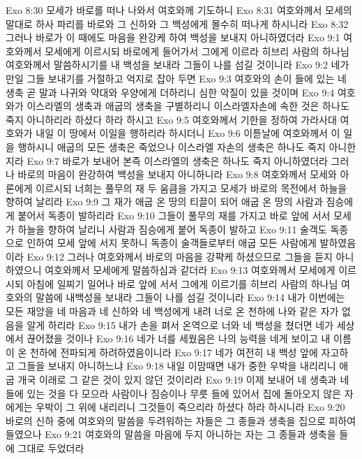 Exo 8:30  모세가 바로를 떠나 나와서 여호와께 기도하니
Exo 8:31  여호와께서 모세의 말대로 하사 파리를 바로와 그 신하와 그 백성에게 몰수히 떠나게 하시니라
Exo 8:32  그러나 바로가 이 때에도 마음을 완강케 하여 백성을 보내지 아니하였더라
Exo 9:1  여호와께서 모세에게 이르시되 바로에게 들어가서 그에게 이르라 히브리 사람의 하나님 여호와께서 말씀하시기를 내 백성을 보내라 그들이 나를 섬길 것이니라
Exo 9:2  네가 만일 그들 보내기를 거절하고 억지로 잡아 두면
Exo 9:3  여호와의 손이 들에 있는 네 생축 곧 말과 나귀와 약대와 우양에게 더하리니 심한 악질이 있을 것이며
Exo 9:4  여호와가 이스라엘의 생축과 애굽의 생축을 구별하리니 이스라엘자손에 속한 것은 하나도 죽지 아니하리라 하셨다 하라 하시고
Exo 9:5  여호와께서 기한을 정하여 가라사대 여호와가 내일 이 땅에서 이일을 행하리라 하시더니
Exo 9:6  이튿날에 여호와께서 이 일을 행하시니 애굽의 모든 생축은 죽었으나 이스라엘 자손의 생축은 하나도 죽지 아니한지라
Exo 9:7  바로가 보내어 본즉 이스라엘의 생축은 하나도 죽지 아니하였더라 그러나 바로의 마음이 완강하여 백성을 보내지 아니하니라
Exo 9:8  여호와께서 모세와 아론에게 이르시되 너희는 풀무의 재 두 움큼을 가지고 모세가 바로의 목전에서 하늘을 향하여 날리라
Exo 9:9  그 재가 애굽 온 땅의 티끌이 되어 애굽 온 땅의 사람과 짐승에게 붙어서 독종이 발하리라
Exo 9:10  그들이 풀무의 재를 가지고 바로 앞에 서서 모세가 하늘을 향하여 날리니 사람과 짐승에게 붙어 독종이 발하고
Exo 9:11  술객도 독종으로 인하여 모세 앞에 서지 못하니 독종이 술객들로부터 애굽 모든 사람에게 발하였음이라
Exo 9:12  그러나 여호와께서 바로의 마음을 강퍅케 하셨으므로 그들을 듣지 아니하였으니 여호와께서 모세에게 말씀하심과 같더라
Exo 9:13  여호와께서 모세에게 이르시되 아침에 일찌기 일어나 바로 앞에 서서 그에게 이르기를 히브리 사람의 하나님 여호와의 말씀에 내백성을 보내라 그들이 나를 섬길 것이니라
Exo 9:14  내가 이번에는 모든 재앙을 네 마음과 네 신하와 네 백성에게 내려 너로 온 천하에 나와 같은 자가 없음을 알게 하리라
Exo 9:15  내가 손을 펴서 온역으로 너와 네 백성을 쳤더면 네가 세상에서 끊어졌을 것이나
Exo 9:16  네가 너를 세웠음은 나의 능력을 네게 보이고 내 이름이 온 천하에 전파되게 하려하였음이니라
Exo 9:17  네가 여전히 내 백성 앞에 자고하고 그들을 보내지 아니하느냐
Exo 9:18  내일 이맘때면 내가 중한 우박을 내리리니 애굽 개국 이래로 그 같은 것이 있지 않던 것이리라
Exo 9:19  이제 보내어 네 생축과 네 들에 있는 것을 다 모으라 사람이나 짐승이나 무릇 들에 있어서 집에 돌아오지 않은 자에게는 우박이 그 위에 내리리니 그것들이 죽으리라 하셨다 하라 하시니라
Exo 9:20  바로의 신하 중에 여호와의 말씀을 두려워하는 자들은 그 종들과 생축을 집으로 피하여 들였으나
Exo 9:21  여호와의 말씀을 마음에 두지 아니하는 자는 그 종들과 생축을 들에 그대로 두었더라
